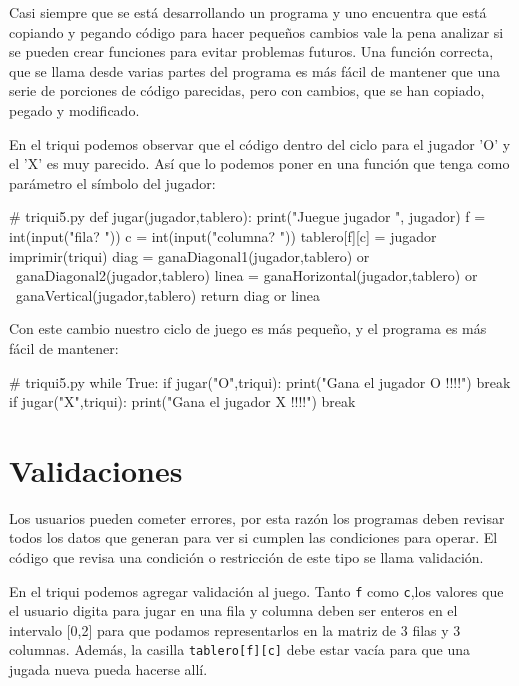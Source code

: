 
Casi siempre que se está desarrollando un programa y uno encuentra
que está copiando y pegando código para hacer pequeños cambios vale
la pena analizar si se pueden crear funciones para evitar problemas
futuros. Una función correcta, que se llama desde varias partes del
programa es más fácil de mantener que una serie de porciones de código
parecidas, pero con cambios, que se han copiado, pegado y modificado.

En el triqui podemos observar que el código dentro del ciclo para
el jugador 'O' y el 'X' es muy parecido. Así que lo podemos poner
en una función que tenga como parámetro el símbolo del jugador:

\begin{pythoncode}
# triqui5.py
def jugar(jugador,tablero):
    print("Juegue jugador ", jugador)
    f = int(input("fila? "))
    c = int(input("columna? "))
    tablero[f][c] = jugador
    imprimir(triqui)
    diag = ganaDiagonal1(jugador,tablero) or \
           ganaDiagonal2(jugador,tablero)
    linea = ganaHorizontal(jugador,tablero) or \ 
            ganaVertical(jugador,tablero)
    return  diag or linea
\end{pythoncode}

Con este cambio nuestro ciclo de juego es más pequeño, y el programa
es más fácil de mantener:

\begin{pythoncode}
# triqui5.py
while True:
    if jugar("O",triqui):
        print("Gana el jugador O !!!!")
        break
    if jugar("X",triqui):
        print("Gana el jugador X !!!!")
        break
\end{pythoncode}

\section{Validaciones}


Los usuarios pueden cometer errores, por esta razón los programas
deben revisar todos los datos que generan para ver si cumplen las
condiciones para operar. El código que revisa una condición o restricción
de este tipo se llama validación.

En el triqui podemos agregar validación al juego. Tanto \texttt{f}
como \texttt{c},los valores que el usuario digita para jugar en una
fila y columna deben ser enteros en el intervalo {[}0,2{]} para que
podamos representarlos en la matriz de 3 filas y 3 columnas. Además,
la casilla \texttt{tablero{[}f{]}{[}c{]}} debe estar vacía para que
una jugada nueva pueda hacerse allí.

